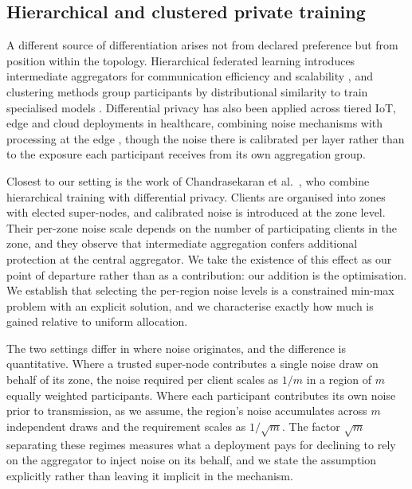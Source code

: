 \documentclass[acmsmall,screen,review,anonymous]{acmart}
\theoremstyle{acmdefinition}%
\begin{document}
\subsection{Hierarchical and clustered private training}

A different source of differentiation arises not from declared preference but from position within the topology. Hierarchical federated learning introduces intermediate aggregators for
communication efficiency and scalability \cite{liu2020clientedgecloud,
abad2020hierarchical}, and clustering methods group participants by distributional
similarity to train specialised models \cite{briggs2020federated}. Differential
privacy has also been applied across tiered IoT, edge and cloud deployments in
healthcare, combining noise mechanisms with processing at the edge
\cite{mangala2026dphealthcare}, though the noise there is calibrated per layer
rather than to the exposure each participant receives from its own aggregation
group.

Closest to our setting is the work of Chandrasekaran et
al.~\cite{chandrasekaran2022hfl}, who combine hierarchical training with
differential privacy. Clients are organised into zones with elected super-nodes,
and calibrated noise is introduced at the zone level. Their per-zone noise scale
depends on the number of participating clients in the zone, and they observe
that intermediate aggregation confers additional
protection at the central aggregator. We take the existence of this effect as
our point of departure rather than as a contribution: our addition is the
optimisation. We establish that selecting the per-region noise levels is a
constrained min-max problem with an explicit solution, and we characterise
exactly how much is gained relative to uniform allocation.

The two settings differ in where noise originates, and the difference is
quantitative. Where a trusted super-node contributes a single noise draw on behalf
of its zone, the noise required per client scales as $1/m$ in a region of $m$
equally weighted participants. Where each participant contributes its own noise
prior to transmission, as we assume, the region's noise accumulates across $m$
independent draws and the requirement scales as $1/\sqrt{m}$. The factor
$\sqrt{m}$ separating these regimes measures what a deployment pays for declining to
rely on the aggregator to inject noise on its behalf, and we state the assumption
explicitly rather than leaving it implicit in the mechanism.
\end{document}
